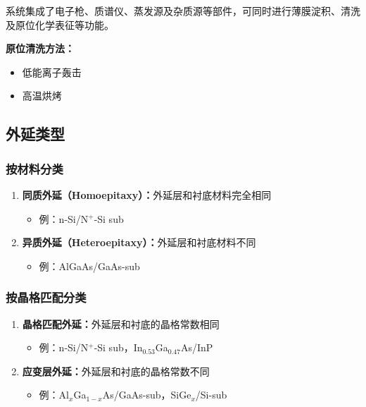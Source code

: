 \documentclass[UTF8,12pt,a4paper]{ctexart}
\begin{document}
系统集成了电子枪、质谱仪、蒸发源及杂质源等部件，可同时进行薄膜淀积、清洗及原位化学表征等功能。

\textbf{原位清洗方法：}
\begin{itemize}
    \item 低能离子轰击
    \item 高温烘烤
\end{itemize}

\subsection{外延类型}

\subsubsection{按材料分类}

\begin{enumerate}
    \item \textbf{同质外延（Homoepitaxy）：}外延层和衬底材料完全相同
    \begin{itemize}
        \item 例：n-Si/N$^+$-Si sub
    \end{itemize}
    
    \item \textbf{异质外延（Heteroepitaxy）：}外延层和衬底材料不同
    \begin{itemize}
        \item 例：AlGaAs/GaAs-sub
    \end{itemize}
\end{enumerate}

\subsubsection{按晶格匹配分类}

\begin{enumerate}
    \item \textbf{晶格匹配外延：}外延层和衬底的晶格常数相同
    \begin{itemize}
        \item 例：n-Si/N$^+$-Si sub，In$_{0.53}$Ga$_{0.47}$As/InP
    \end{itemize}
    
    \item \textbf{应变层外延：}外延层和衬底的晶格常数不同
    \begin{itemize}
        \item 例：Al$_x$Ga$_{1-x}$As/GaAs-sub，SiGe$_x$/Si-sub
    \end{itemize}
\end{enumerate}
\end{document}
